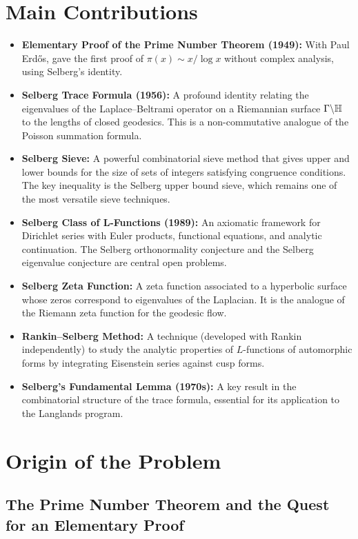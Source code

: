\section{Main Contributions}

\begin{itemize}
    \item \textbf{Elementary Proof of the Prime Number Theorem (1949):} With Paul Erd\H{o}s, gave the first proof of \(\pi(x) \sim x/\log x\) without complex analysis, using Selberg's identity.
    \item \textbf{Selberg Trace Formula (1956):} A profound identity relating the eigenvalues of the Laplace--Beltrami operator on a Riemannian surface \(\Gamma \backslash \mathbb{H}\) to the lengths of closed geodesics. This is a non-commutative analogue of the Poisson summation formula.
    \item \textbf{Selberg Sieve:} A powerful combinatorial sieve method that gives upper and lower bounds for the size of sets of integers satisfying congruence conditions. The key inequality is the Selberg upper bound sieve, which remains one of the most versatile sieve techniques.
    \item \textbf{Selberg Class of L-Functions (1989):} An axiomatic framework for Dirichlet series with Euler products, functional equations, and analytic continuation. The Selberg orthonormality conjecture and the Selberg eigenvalue conjecture are central open problems.
    \item \textbf{Selberg Zeta Function:} A zeta function associated to a hyperbolic surface whose zeros correspond to eigenvalues of the Laplacian. It is the analogue of the Riemann zeta function for the geodesic flow.
    \item \textbf{Rankin--Selberg Method:} A technique (developed with Rankin independently) to study the analytic properties of \(L\)-functions of automorphic forms by integrating Eisenstein series against cusp forms.
    \item \textbf{Selberg's Fundamental Lemma (1970s):} A key result in the combinatorial structure of the trace formula, essential for its application to the Langlands program.
\end{itemize}

\section{Origin of the Problem}

\subsection{The Prime Number Theorem and the Quest for an Elementary Proof}

